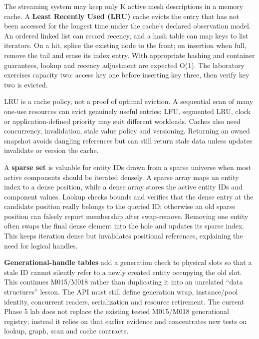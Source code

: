\hypertarget{01-foundations-i-ch008-an-lru-cache-and-a-sparse-set-reconnect-algorithms-to-engine-ownership}{}

The streaming system may keep only K active mesh descriptions in a memory cache. A \textbf{Least Recently Used (LRU)} cache evicts the entry that has not been accessed for the longest time under the cache's declared observation model. An ordered linked list can record recency, and a hash table can map keys to list iterators. On a hit, splice the existing node to the front; on insertion when full, remove the tail and erase its index entry. With appropriate hashing and container guarantees, lookup and recency adjustment are expected O(1). The laboratory exercises capacity two: access key one before inserting key three, then verify key two is evicted.

LRU is a cache policy, not a proof of optimal eviction. A sequential scan of many one-use resources can evict genuinely useful entries; LFU, segmented LRU, clock or application-defined priority may suit different workloads. Caches also need concurrency, invalidation, stale value policy and versioning. Returning an owned snapshot avoids dangling references but can still return stale data unless updates invalidate or version the cache.

A \textbf{sparse set} is valuable for entity IDs drawn from a sparse universe when most active components should be iterated densely. A sparse array maps an entity index to a dense position, while a dense array stores the active entity IDs and component values. Lookup checks bounds and verifies that the dense entry at the candidate position really belongs to the queried ID; otherwise an old sparse position can falsely report membership after swap-remove. Removing one entity often swaps the final dense element into the hole and updates its sparse index. This keeps iteration dense but invalidates positional references, explaining the need for logical handles.

\textbf{Generational-handle tables} add a generation check to physical slots so that a stale ID cannot silently refer to a newly created entity occupying the old slot. This continues M015/M018 rather than duplicating it into an unrelated ``data structures'' lesson. The API must still define generation wrap, instance/pool identity, concurrent readers, serialization and resource retirement. The current Phase 5 lab does not replace the existing tested M015/M018 generational registry; instead it relies on that earlier evidence and concentrates new tests on lookup, graph, scan and cache contracts.

